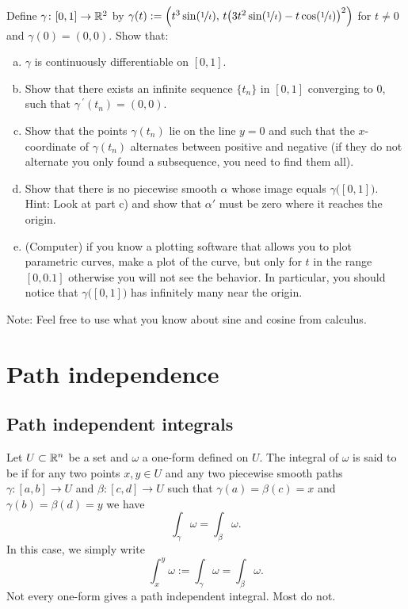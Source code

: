 \begin{exercise}
Define $\gamma \colon [0,1] \to {\mathbb{R}}^2$ by
$\gamma(t) := \Bigl( t^3 \sin(\nicefrac{1}{t}),\,
t{\bigl(3t^2\sin(\nicefrac{1}{t})-t\cos(\nicefrac{1}{t})\bigr)}^2 \Bigr)$
for
$t \not= 0$ and $\gamma(0) = (0,0)$.  Show that:
\begin{enumerate}[a)]
\item
$\gamma$ is continuously differentiable on $[0,1]$.
\item
Show that there exists an infinite sequence $\{ t_n \}$ in $[0,1]$
converging to 0, such that
$\gamma^{\:\prime}(t_n) = (0,0)$.
\item
Show that the points $\gamma(t_n)$ lie on the line $y=0$ and such
that the $x$-coordinate of $\gamma(t_n)$ alternates between positive and
negative (if they do not alternate you only found a subsequence,
you need to find them all).
\item
Show that there is no piecewise smooth $\alpha$ whose image equals
$\gamma\bigl([0,1]\bigr)$.  Hint: Look at part c) and show that $\alpha'$
must be zero where it reaches the origin.
\item
(Computer) if you know a plotting software that allows you to plot
parametric curves, make a plot of the curve, but only for $t$ in the
range $[0,0.1]$ otherwise you will not see the behavior.  In particular, you
should notice that $\gamma\bigl([0,1]\bigr)$ has infinitely many
near the origin.
\end{enumerate}
Note: Feel free to use what you know about sine and cosine from calculus.
\end{exercise}


\sectionnewpage
\section{Path independence}
\label{sec:pathind}


\subsection{Path independent integrals}

Let $U \subset {\mathbb{R}}^n$ be a set and $\omega$ a one-form defined on $U$.
The integral of $\omega$
is said to be \emph{}
if for any two points $x,y \in U$ and
any two piecewise smooth paths
$\gamma \colon [a,b] \to U$ and
$\beta \colon [c,d] \to U$ such that $\gamma(a) = \beta(c) = x$
and $\gamma(b) = \beta(d) = y$ we have
\begin{equation*}
\int_\gamma \omega = \int_\beta \omega .
\end{equation*}
In this case, we simply write
\begin{equation*}
\int_x^y \omega := \int_\gamma \omega = \int_\beta \omega .
\end{equation*}
Not every one-form gives a path independent integral.  Most do not.

